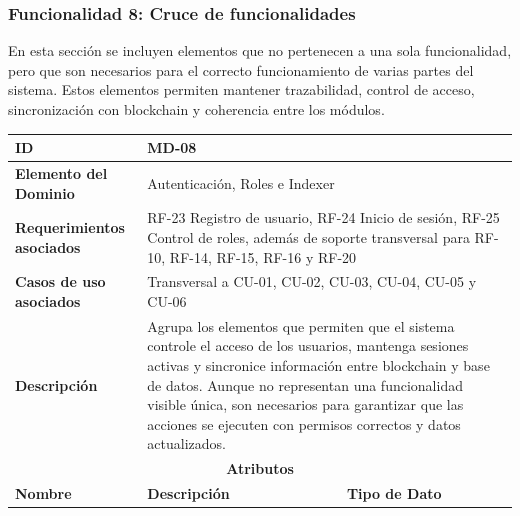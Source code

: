 \documentclass[12pt,letterpaper]{article}
\begin{document}
\subsubsection{Funcionalidad 8: Cruce de funcionalidades}
En esta sección se incluyen elementos que no pertenecen a una sola funcionalidad, pero que son necesarios para el correcto funcionamiento de varias partes del sistema. Estos elementos permiten mantener trazabilidad, control de acceso, sincronización con blockchain y coherencia entre los módulos.
\begin{table}[H]
\centering
\scriptsize
\renewcommand{\arraystretch}{1.12}
\setlength{\tabcolsep}{4pt}

\begin{tabularx}{\textwidth}{|p{3.2cm}|X|p{3.8cm}|}
\hline
\textbf{ID} & MD-08 & \\ \hline

\textbf{Elemento del Dominio} & 
\multicolumn{2}{X|}{Autenticación, Roles e Indexer} \\ \hline

\textbf{Requerimientos asociados} & 
\multicolumn{2}{X|}{RF-23 Registro de usuario, RF-24 Inicio de sesión, RF-25 Control de roles, además de soporte transversal para RF-10, RF-14, RF-15, RF-16 y RF-20} \\ \hline

\textbf{Casos de uso asociados} & 
\multicolumn{2}{X|}{Transversal a CU-01, CU-02, CU-03, CU-04, CU-05 y CU-06} \\ \hline

\textbf{Descripción} & 
\multicolumn{2}{X|}{Agrupa los elementos que permiten que el sistema controle el acceso de los usuarios, mantenga sesiones activas y sincronice información entre blockchain y base de datos. Aunque no representan una funcionalidad visible única, son necesarios para garantizar que las acciones se ejecuten con permisos correctos y datos actualizados.} \\ \hline

\multicolumn{3}{|c|}{\textbf{Atributos}} \\ \hline

\textbf{Nombre} & \textbf{Descripción} & \textbf{Tipo de Dato} \\ \hline


\end{tabularx}
\end{table}
\end{document}
